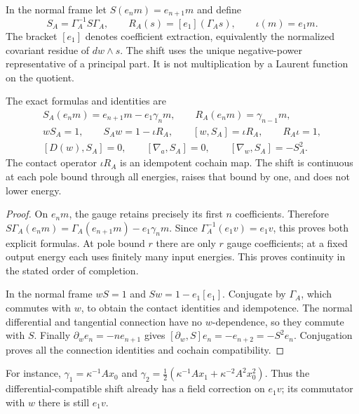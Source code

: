 In the normal frame let $S(e_nm)=e_{n+1}m$ and define
\[
 S_A=\Gamma_A^{-1}S\Gamma_A,
 \qquad R_A(s)=[e_1](\Gamma_As),\qquad \iota(m)=e_1m.
\]
The bracket $[e_1]$ denotes coefficient extraction, equivalently the
normalized covariant residue of $dw\wedge s$.
The shift uses the unique negative-power representative of a principal
part.  It is not multiplication by a Laurent function on the quotient.

\begin{proposition}\label{cyquant:prop:contact}
The exact formulas and identities are
\begin{equation}\label{cyquant:eq:contact}
 \begin{gathered}
 S_A(e_nm)=e_{n+1}m-e_1\gamma_nm,\qquad
 R_A(e_nm)=\gamma_{n-1}m,\\
 wS_A=1,\qquad S_Aw=1-\iota R_A,
 \qquad [w,S_A]=\iota R_A,\qquad R_A\iota=1,\\
 [D(w),S_A]=0,\qquad [\nabla_a,S_A]=0,
 \qquad [\nabla_w,S_A]=-S_A^2.
 \end{gathered}
\end{equation}
The contact operator $\iota R_A$ is an idempotent cochain map.
The shift is continuous at each pole bound through all energies,
raises that bound by one, and does not lower energy.
\end{proposition}

\begin{proof}
On $e_nm$, the gauge retains precisely its first $n$ coefficients.
Therefore
$S\Gamma_A(e_nm)=\Gamma_A(e_{n+1}m)-e_1\gamma_nm$.
Since $\Gamma_A^{-1}(e_1v)=e_1v$, this proves both explicit formulas.
At pole bound $r$ there are only $r$ gauge coefficients; at a fixed
output energy each uses finitely many input energies.  This proves
continuity in the stated order of completion.

In the normal frame $wS=1$ and $Sw=1-e_1[e_1]$.
Conjugate by $\Gamma_A$, which commutes with $w$, to obtain the
contact identities and idempotence.  The normal differential and
tangential connection have no $w$-dependence, so they commute with
$S$.  Finally $\partial_we_n=-ne_{n+1}$ gives
$[\partial_w,S]e_n=-e_{n+2}=-S^2e_n$.  Conjugation proves all the
connection identities and cochain compatibility.
\end{proof}

For instance,
$\gamma_1=\kappa^{-1}Ax_0$ and
$\gamma_2=\frac12(\kappa^{-1}Ax_1+\kappa^{-2}A^2x_0^2)$.
Thus the differential-compatible shift already has a field correction
on $e_1v$; its commutator with $w$ there is still $e_1v$.

